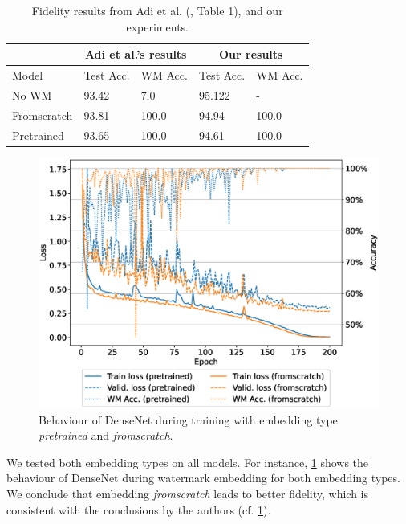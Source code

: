
\begin{table}
\centering
\caption{Fidelity results from Adi et al. (\cite{adi_turning_2018}, Table 1), and our experiments.}
\label{tab:results-fidelity:weakness:compared}
\begin{tabular}{|l|l|l||l|l|}
\hline
& \multicolumn{2}{c|}{Adi et al.'s results} & \multicolumn{2}{c|}{Our results}  \\ \hline
Model          & Test Acc.    & WM Acc.        & Test Acc. & WM Acc. \\ \hline
No WM          & 93.42        & 7.0               & 95.122    & -       \\ \hline
Fromscratch    & 93.81        & 100.0       & 94.94     & 100.0   \\ \hline
Pretrained     & 93.65        & 100.0        & 94.61     & 100.0   \\ \hline
\end{tabular}
\end{table}

\begin{figure}
    \centering
    \includegraphics[width=0.7\linewidth]{images/weakness/weakness_pretrained_vs_fromscratch.eps}
    \caption{Behaviour of DenseNet during training with embedding type \textit{pretrained} and \textit{fromscratch}.}
    \label{fig:weakness-pretrained-fromscratch}
\end{figure}

We tested both embedding types on all models. For instance, \cref{fig:weakness-pretrained-fromscratch} shows the behaviour of DenseNet during watermark embedding for both embedding types. We conclude that embedding \textit{fromscratch} leads to better fidelity, which is consistent with the conclusions by the authors (cf. \cref{fig:weakness-pretrained-fromscratch}).

